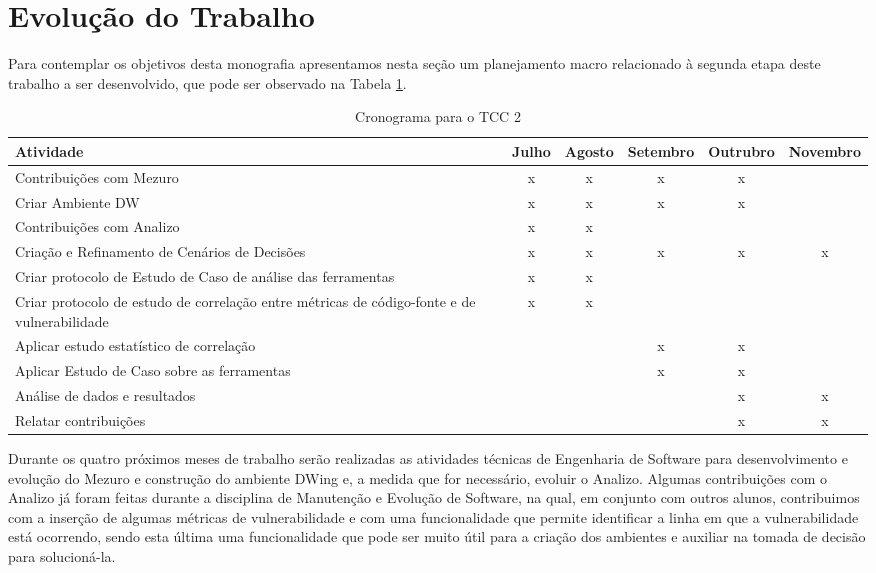 
\section{Evolução do Trabalho}

%

Para contemplar os objetivos desta monografia apresentamos nesta seção um planejamento macro relacionado à segunda etapa deste trabalho a ser desenvolvido, que pode ser observado na Tabela \ref{tab:cronograma}.

%


	\begin{table}[H]
	\begin{center}
	    \begin{tabular}{ | p{5cm} | c | c |  c |  c |  c |}
	    \hline
	    Atividade & Julho & Agosto & Setembro & Outrubro & Novembro \\ \hline
	    Contribuições com Mezuro & x & x & x & x &  \\ \hline
	    Criar Ambiente DW & x & x & x & x & \\ \hline
	    Contribuições com Analizo & x & x &  &  & \\ \hline
	    Criação e Refinamento de Cenários de Decisões & x & x & x & x & x\\ \hline
	    Criar protocolo de Estudo de Caso de análise das ferramentas & x & x &  &  & \\ \hline
	    Criar protocolo de estudo de correlação entre métricas de código-fonte e de vulnerabilidade & x & x &  &  & \\ \hline
	    Aplicar estudo estatístico de correlação &  &  & x & x & \\ \hline
	    Aplicar Estudo de Caso sobre as ferramentas &  &  & x & x & \\ \hline
	    Análise de dados e resultados &  &  &  & x & x\\ \hline
	    Relatar contribuições &  &  &  & x & x\\ \hline
	    \end{tabular}
	    \caption{Cronograma para o TCC 2}
	    \label{tab:cronograma}
	\end{center}
	\end{table}

Durante os quatro próximos meses de trabalho serão realizadas as atividades técnicas de Engenharia de Software para desenvolvimento e evolução do Mezuro e construção do ambiente DWing e, a medida que for necessário, evoluir o Analizo. Algumas contribuições com o Analizo já foram feitas durante a disciplina de Manutenção e Evolução de Software, na qual, em conjunto com outros alunos, contribuimos com a inserção de algumas métricas de vulnerabilidade e com uma funcionalidade que permite identificar a linha em que a vulnerabilidade está ocorrendo, sendo esta última uma funcionalidade que pode ser muito útil para a criação dos ambientes e auxiliar na tomada de decisão para solucioná-la.

